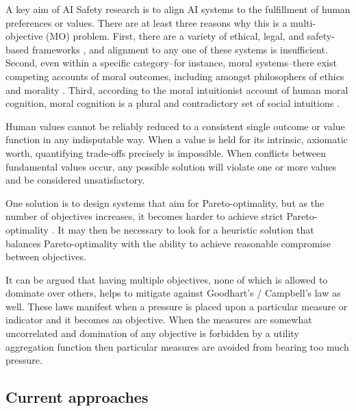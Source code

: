 

A key aim of AI Safety research is to align AI systems to the fulfillment of human preferences \cite{Bostrom2014, russell2019human} or values. There are at least three reasons why this is a multi-objective (MO) problem. First, there are a variety of ethical, legal, and safety-based frameworks \cite{vamplew_human-aligned_2018}, and alignment to any one of these systems is insufficient. Second, even within a specific category--for instance, moral systems--there exist competing accounts of moral outcomes, including amongst philosophers of ethics and morality \cite{bogosian_implementation_2017}. Third, according to the moral intuitionist account of human moral cognition, moral cognition is a plural and contradictory set of social intuitions \cite{haidt2001emotional,sotala2016defining}.

Human values cannot be reliably reduced to a consistent single outcome or value function in any indisputable way. When a value is held for its intrinsic, axiomatic worth, quantifying trade-offs precisely is impossible. When conflicts between fundamental values occur, any possible solution will violate one or more values and be considered unsatisfactory.  

One solution is to design systems that aim for Pareto-optimality, but as the number of objectives increases, it becomes harder to achieve strict Pareto-optimality \cite{rolf_need_2020}. It may then be necessary to look for a heuristic solution that balances Pareto-optimality with the ability to achieve reasonable compromise between objectives. %

It can be argued that having multiple objectives, none of which is allowed to dominate over others, helps to mitigate against Goodhart's / Campbell's law as well. These laws manifest when a pressure is placed upon a particular measure or indicator and it becomes an objective. When the measures are somewhat uncorrelated and domination of any objective is forbidden by a utility aggregation function then particular measures are avoided from bearing too much pressure.





\subsection{Current approaches}

